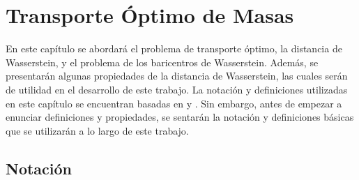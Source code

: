 \chapter{Transporte Óptimo de Masas}
En este capítulo se abordará el problema de transporte óptimo, la distancia de Wasserstein, y el problema de los baricentros de Wasserstein. Además, se presentarán algunas propiedades de la distancia de Wasserstein, las cuales serán de utilidad en el desarrollo de este trabajo. La notación y definiciones utilizadas en este capítulo se encuentran basadas en \cite{villani2009optimal} y \cite{peyre2019computational}. Sin embargo, antes de empezar a enunciar definiciones y propiedades, se sentarán la notación y definiciones básicas que se utilizarán a lo largo de este trabajo.

\section{Notación}
